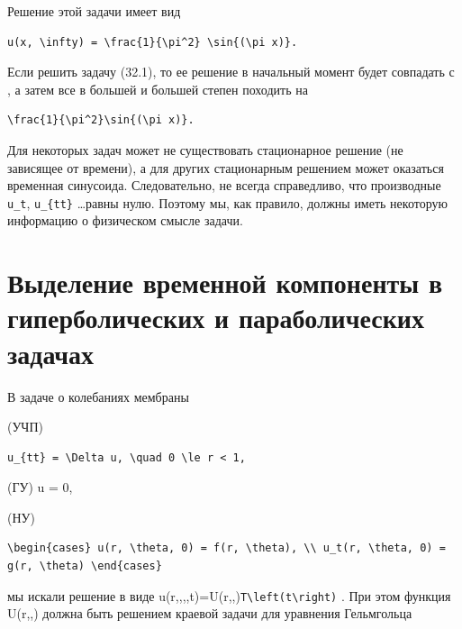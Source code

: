 \documentclass[
  ukrainian,
]{article}
\begin{document}
Решение этой задачи имеет вид

\begin{verbatim}
u(x, \infty) = \frac{1}{\pi^2} \sin{(\pi x)}.
\end{verbatim}

Если решить задачу (32.1), то ее решение в начальный момент будет
совпадать с  , а затем все в большей и большей степен
походить на

\begin{verbatim}
\frac{1}{\pi^2}\sin{(\pi x)}.
\end{verbatim}

Для некоторых задач может не существовать стационарное решение (не
зависящее от времени), а для других стационарным решением может
оказаться временная синусоида. Следовательно, не всегда справедливо, что
производные \texttt{u\_t}, \texttt{u\_\{tt\}} \dots   равны нулю.
Поэтому мы, как правило, должны иметь некоторую информацию о физическом
смысле задачи.

\section{Выделение временной компоненты в гиперболических и
параболических
задачах}\label{ux432ux44bux434ux435ux43bux435ux43dux438ux435-ux432ux440ux435ux43cux435ux43dux43dux43eux439-ux43aux43eux43cux43fux43eux43dux435ux43dux442ux44b-ux432-ux433ux438ux43fux435ux440ux431ux43eux43bux438ux447ux435ux441ux43aux438ux445-ux438-ux43fux430ux440ux430ux431ux43eux43bux438ux447ux435ux441ux43aux438ux445-ux437ux430ux434ux430ux447ux430ux445}

В задаче о колебаниях мембраны

(УЧП)

\begin{verbatim}
u_{tt} = \Delta u, \quad 0 \le r < 1,
\end{verbatim}

(ГУ) u = 0, \quad {}

(НУ)

\begin{verbatim}
\begin{cases} u(r, \theta, 0) = f(r, \theta), \\ u_t(r, \theta, 0) = g(r, \theta) \end{cases}
\end{verbatim}

мы искали решение в виде
u\left(r,,\theta,,t\right)=U\left(r,,\theta\right)\texttt{T\textbackslash{}left(t\textbackslash{}right)}
. При этом функция U\left(r,,\theta\right) должна быть решением краевой
задачи для уравнения Гельмгольца
\end{document}
